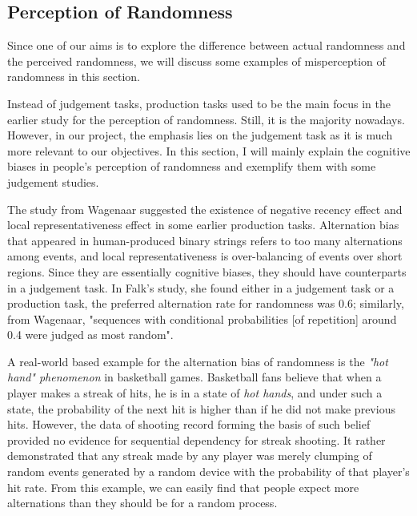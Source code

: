 \documentclass[12pt]{article}
\theoremstyle{plain}
\theoremstyle{definition}
\theoremstyle{remark}
\begin{document}
\newpage
\subsection{Perception of Randomness}
Since one of our aims is to explore the difference between actual randomness and the perceived randomness, we will discuss some examples of misperception of randomness in this section.

Instead of judgement tasks, production tasks used to be the main focus in the earlier study for the perception of randomness. Still, it is the majority nowadays. However, in our project, the emphasis lies on the judgement task as it is much more relevant to our objectives. In this section, I will mainly explain the cognitive biases in people's perception of randomness and exemplify them with some judgement studies.

The study from Wagenaar\cite[434]{1.2} suggested the existence of negative recency effect and local representativeness effect in some earlier production tasks. Alternation bias that appeared in human-produced binary strings refers to too many alternations among events, and local representativeness is over-balancing of events over short regions\cite[434]{1.2}. Since they are essentially cognitive biases, they should have counterparts in a judgement task. In Falk's study\cite[434]{1.2}, she found either in a judgement task or a production task, the preferred alternation rate for randomness was 0.6; similarly, from Wagenaar\cite[435]{1.2}, "sequences with conditional probabilities [of repetition] around 0.4 were judged as most random".

A real-world based example for the alternation bias of randomness is the \textit{"hot hand" phenomenon} in basketball games. Basketball fans believe that when a player makes a streak of hits, he is in a state of \textit{hot hands}, and under such a state, the probability of the next hit is higher than if he did not make previous hits. However, the data of shooting record\cite[437]{1.2} forming the basis of such belief provided no evidence for sequential dependency for streak shooting. It rather demonstrated that any streak made by any player was merely clumping of random events generated by a random device with the probability of that player's hit rate\cite[437]{1.2}. From this example, we can easily find that people expect more alternations than they should be for a random process.
\end{document}
